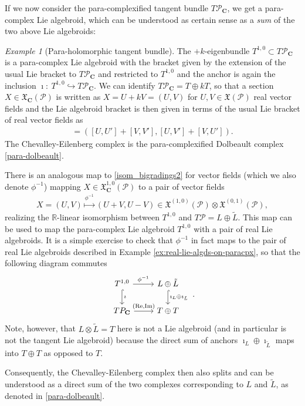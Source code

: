 \documentclass[letterpaper,12pt]{article}
\newcommand{\Cc}{\mathbf{C}}
\newcommand{\XX}{\mathfrak{X}}
\newcommand{\PS}{\mathcal{P}}
\newcommand{\Lt}{{\tl{L}}}
\def\tl{\tilde}
\theoremstyle{definition}
\theoremstyle{remark}
\theoremstyle{examples}
\newtheorem{Ex}[theorem]{Example}
\begin{document}
If we now consider the para-complexified tangent bundle $T\PS_\Cc$, we get a para-complex Lie algebroid, which can be understood as certain sense as a {\it sum} of the two above Lie algebroids:
\begin{Ex}[Para-holomorphic tangent bundle]\label{ex:para-hol-tangent}
The $+k$-eigenbundle $T^{1,0}\subset T\PS_\Cc$ is a para-complex Lie algebroid with the bracket given by the extension of the usual Lie bracket to $T\PS_\Cc$ and restricted to $T^{1,0}$ and the anchor is again the inclusion $\imath:\  T^{1,0}\hookrightarrow T\PS_\Cc$. We can identify $T\PS_\Cc=T\oplus k T$, so that a section $X\in \XX_\Cc(\PS)$ is written as $X=U+kV=(U,V)$ for $U,V \in \XX(\PS)$ real vector fields and the Lie algebroid bracket is then given in terms of the usual Lie bracket of real vector fields as
\begin{align*}
[(U,V),(U',V')]=([U,U']+[V,V'],[U,V']+[V,U']).
\end{align*}
The Chevalley-Eilenberg complex is the para-complexified Dolbeault complex \eqref{para-dolbeault}.


There is an analogous map to \eqref{isom_bigradings2} for vector fields (which we also denote $\phi^{-1}$) mapping $X \in \XX^{1,0}_\Cc(\PS)$ to a pair of vector fields
\begin{align*}
X=(U,V) \overset{\phi^{-1}}{\mapsto} (U+V,U-V) \in \XX^{(1,0)}(\PS)\otimes \XX^{(0,1)}(\PS),
\end{align*}
realizing the $\mathbb{R}$-linear isomorphism between $T^{1,0}$ and $T\PS=L\oplus \Lt$. This map can be used to map the para-complex Lie algebroid $T^{1,0}$ with a pair of real Lie algebroids. It is a simple exercise to check that $\phi^{-1}$ in fact maps to the pair of real Lie algebroids described in Example \ref{ex:real-lie-algds-on-paracpx}, so that the following diagram commutes
\begin{equation*}
\begin{tikzcd}
T^{1,0} \arrow[hookrightarrow]{d}{\imath}\arrow{r}{\phi^{-1}} & L\oplus \Lt\arrow[hookrightarrow]{d}{\imath_L\oplus\imath_\Lt}\\
TP_\Cc \arrow{r}{(\text{Re},\text{Im})} & T\oplus T
\end{tikzcd}\ .
\end{equation*}
Note, however, that $L\otimes \Lt=T$ here is not a Lie algebroid (and in particular is not the tangent Lie algebroid) because the direct sum of anchors $\imath_L\oplus \imath_\Lt$ maps into $T\oplus T$ as opposed to $T$.

Consequently, the Chevalley-Eilenberg complex then also splits and can be understood as a direct sum of the two complexes corresponding to $L$ and $\Lt$, as denoted in \eqref{para-dolbeault}.
\end{Ex}
\end{document}
